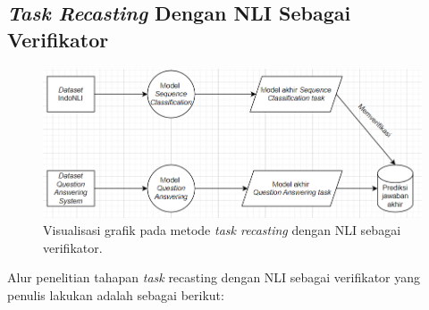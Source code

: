 \subsection{\emph{Task Recasting} Dengan NLI Sebagai Verifikator}
\label{3.4.2}

\begin{figure}[h]
\includegraphics[width=\linewidth]{assets/pics/alur2.png}
\centering
\caption{Visualisasi grafik pada metode \emph{task recasting} dengan NLI sebagai verifikator.}
\end{figure}

Alur penelitian tahapan \emph{task} recasting dengan NLI sebagai verifikator yang penulis lakukan adalah sebagai berikut:

